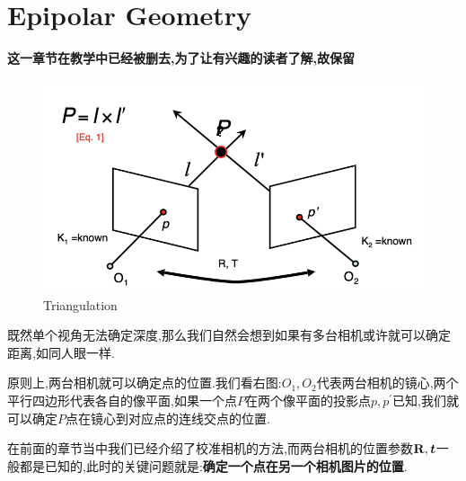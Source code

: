 \section{Epipolar Geometry}

\textbf{这一章节在教学中已经被删去,为了让有兴趣的读者了解,故保留}

\begin{figure}
	\includegraphics[scale=0.3]{figures/triangulation.png}
	\caption{Triangulation}
\end{figure}

既然单个视角无法确定深度,那么我们自然会想到如果有多台相机或许就可以确定距离,如同人眼一样.

原则上,两台相机就可以确定点的位置.我们看右图:$O_1, O_2$代表两台相机的镜心,两个平行四边形代表各自的像平面,如果一个点$P$在两个像平面的投影点$p, p^\prime$已知,我们就可以确定$P$点在镜心到对应点的连线交点的位置.

在前面的章节当中我们已经介绍了校准相机的方法,而两台相机的位置参数$\bold{R}, \boldsymbol t$一般都是已知的,此时的关键问题就是:\textbf{确定一个点在另一个相机图片的位置}.



